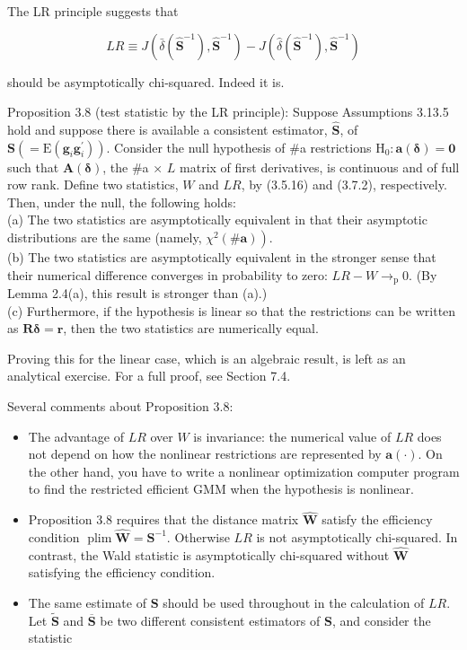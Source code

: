 \documentclass[10pt]{article}
\begin{document}
The LR principle suggests that


\begin{equation*}
L R \equiv J\left(\bar{\delta}\left(\widehat{\mathbf{S}}^{-1}\right), \widehat{\mathbf{S}}^{-1}\right)-J\left(\hat{\delta}\left(\widehat{\mathbf{S}}^{-1}\right), \widehat{\mathbf{S}}^{-1}\right) \tag{3.7.2}
\end{equation*}


should be asymptotically chi-squared. Indeed it is.

Proposition 3.8 (test statistic by the LR principle): Suppose Assumptions 3.13.5 hold and suppose there is available a consistent estimator, $\widehat{\mathbf{S}}$, of $\mathbf{S}\left(=\mathrm{E}\left(\mathbf{g}_{i} \mathbf{g}_{i}^{\prime}\right)\right)$. Consider the null hypothesis of \#a restrictions $\mathrm{H}_{0}: \mathbf{a}(\boldsymbol{\delta})=\mathbf{0}$ such that $\mathbf{A}(\boldsymbol{\delta})$, the \#a × $L$ matrix of first derivatives, is continuous and of full row rank. Define two statistics, $W$ and $L R$, by (3.5.16) and (3.7.2), respectively. Then, under the null, the following holds:\\
(a) The two statistics are asymptotically equivalent in that their asymptotic distributions are the same (namely, $\left.\chi^{2}(\# \mathbf{a})\right)$.\\
(b) The two statistics are asymptotically equivalent in the stronger sense that their numerical difference converges in probability to zero: $L R-W \rightarrow_{\mathrm{p}} 0$. (By Lemma 2.4(a), this result is stronger than (a).)\\
(c) Furthermore, if the hypothesis is linear so that the restrictions can be written as $\mathbf{R} \boldsymbol{\delta}=\mathbf{r}$, then the two statistics are numerically equal.

Proving this for the linear case, which is an algebraic result, is left as an analytical exercise. For a full proof, see Section 7.4.

Several comments about Proposition 3.8:

\begin{itemize}
  \item The advantage of $L R$ over $W$ is invariance: the numerical value of $L R$ does not depend on how the nonlinear restrictions are represented by $\mathbf{a}(\cdot)$. On the other hand, you have to write a nonlinear optimization computer program to find the restricted efficient GMM when the hypothesis is nonlinear.
  \item Proposition 3.8 requires that the distance matrix $\widehat{\mathbf{W}}$ satisfy the efficiency condition $\operatorname{plim} \widehat{\mathbf{W}}=\mathbf{S}^{-1}$. Otherwise $L R$ is not asymptotically chi-squared. In contrast, the Wald statistic is asymptotically chi-squared without $\widehat{\mathbf{W}}$ satisfying the efficiency condition.
  \item The same estimate of $\mathbf{S}$ should be used throughout in the calculation of $L R$. Let $\widetilde{\mathbf{S}}$ and $\overline{\mathbf{S}}$ be two different consistent estimators of $\mathbf{S}$, and consider the statistic
\end{itemize}
\end{document}
